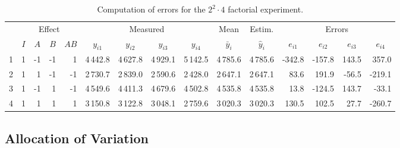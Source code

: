 \documentclass[11pt]{article}
\theoremstyle{definition}
\begin{document}
\begin{table}[h!]
    \centering
    \scriptsize
    {
        \begin{tabular}{|c||r|r|r|r||r|r|r|r||r||r||r|r|r|r|}
            \hline
            \rowcolor{Gray}
            & \multicolumn{4}{c||}{Effect} & \multicolumn{4}{c||}{Measured} & \multicolumn{1}{c||}{Mean} & \multicolumn{1}{c||}{Estim.} & \multicolumn{4}{c|}{Errors} \\
            \hhline{|~||--------------}
            \rowcolor{Gray}
            \multirow{-2}{*}{$i$}
            & \multicolumn{1}{c|}{$I$} & \multicolumn{1}{c|}{$A$} & \multicolumn{1}{c|}{$B$} & \multicolumn{1}{c||}{\!\!$AB$\!\!} & \multicolumn{1}{c|}{$y_{i1}$} & \multicolumn{1}{c|}{$y_{i2}$} & \multicolumn{1}{c|}{$y_{i3}$} & \multicolumn{1}{c||}{$y_{i4}$} & \multicolumn{1}{c||}{$\bar y_i$} & \multicolumn{1}{c||}{$\hat y_i$} & \multicolumn{1}{c|}{$e_{i1}$} & \multicolumn{1}{c|}{$e_{i2}$} & \multicolumn{1}{c|}{$e_{i3}$} & \multicolumn{1}{c|}{$e_{i4}$} \\
            \hline
            1 & 1 & -1 & -1 & 1 & 4\,442.8 & 4\,627.8 & 4\,929.1 & 5\,142.5 & 4\,785.6 & 4\,785.6 & -342.8 & -157.8 & 143.5 & 357.0 \\
            2 & 1 & 1 & -1 & -1 & 2\,730.7 & 2\,839.0 & 2\,590.6 & 2\,428.0 & 2\,647.1 & 2\,647.1 & 83.6 & 191.9 & -56.5 & -219.1 \\
            3 & 1 & -1 & 1 & -1 & 4\,549.6 & 4\,411.3 & 4\,679.6 & 4\,502.8 & 4\,535.8 & 4\,535.8 & 13.8 & -124.5 & 143.7 & -33.1 \\
            4 & 1 & 1 & 1 & 1 & 3\,150.8 & 3\,122.8 & 3\,048.1 & 2\,759.6 & 3\,020.3 & 3\,020.3 & 130.5 & 102.5 & 27.7 & -260.7 \\
            \hline
        \end{tabular}
    }
    \caption{Computation of errors for the $2^2\cdot4$ factorial experiment.}
    \label{tab:4_fe-re}
\end{table}

\subsection{Allocation of Variation}
\end{document}
